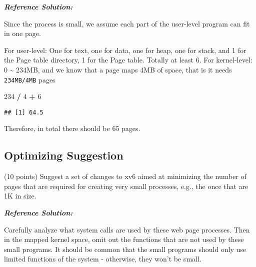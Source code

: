 \documentclass[]{article}
\newenvironment{Shaded}{\begin{snugshade}}{\end{snugshade}}
\newcommand{\DecValTok}[1]{\textcolor[rgb]{0.00,0.00,0.81}{#1}}
\newcommand{\OperatorTok}[1]{\textcolor[rgb]{0.81,0.36,0.00}{\textbf{#1}}}
\newcommand{\StringTok}[1]{\textcolor[rgb]{0.31,0.60,0.02}{#1}}
\begin{document}
\textbf{\emph{Reference Solution:}}

Since the process is small, we assume each part of the user-level
program can fit in one page.

For user-level: One for text, one for data, one for heap, one for stack,
and 1 for the Page table directory, 1 for the Page table. Totally at
least 6. For kernel-level: 0 \textasciitilde{} 234MB, and we know that a
page maps 4MB of space, that is it needs \texttt{234MB/4MB} pages

\begin{Shaded}
\begin{Highlighting}[]
\DecValTok{234} \OperatorTok{/}\StringTok{ }\DecValTok{4} \OperatorTok{+}\StringTok{ }\DecValTok{6}
\end{Highlighting}
\end{Shaded}

\begin{verbatim}
## [1] 64.5
\end{verbatim}

Therefore, in total there should be 65 pages.

\hypertarget{optimizing-suggestion}{%
\subsection{Optimizing Suggestion}\label{optimizing-suggestion}}

(10 points) Suggest a set of changes to xv6 aimed at minimizing the
number of pages that are required for creating very small processes,
e.g., the once that are 1K in size.

\textbf{\emph{Reference Solution:}}

Carefully analyze what system calls are used by these web page
processes. Then in the mapped kernel space, omit out the functions that
are not used by these small programs. It should be common that the small
programs should only use limited functions of the system - otherwise,
they won't be small.
\end{document}
